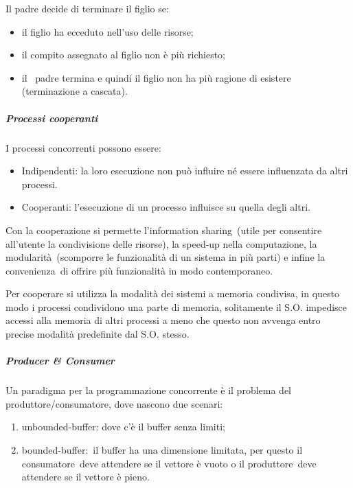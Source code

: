 \documentclass[
]{article}
\providecommand{\tightlist}{%
  \setlength{\itemsep}{0pt}\setlength{\parskip}{0pt}}
\begin{document}
{Il padre decide di terminare il figlio se:}

\begin{itemize}
\tightlist
\item
  {il figlio ha ecceduto nell'uso delle risorse;}
\item
  {il compito assegnato al figlio non è più richiesto;}
\item
  {il ~padre termina e quindi il figlio non ha più ragione di esistere
  (}{terminazione a cascata}{).}
\end{itemize}

\subparagraph{\texorpdfstring{{Processi
cooperanti}}{Processi cooperanti}}\label{h.3zgn3syfyvga}

{I processi concorrenti possono essere:}

{}

\begin{itemize}
\tightlist
\item
  {Indipendenti}{: la loro esecuzione non può influire né essere
  influenzata da altri processi.}
\item
  {Cooperanti}{: l'esecuzione di un processo influisce su quella degli
  altri. }
\end{itemize}

{}

{Con la cooperazione si permette l'}{information sharing}{~(utile per
consentire all'utente la condivisione delle risorse), la }{speed-up
nella computazione}{, la }{modularità}{~(scomporre le funzionalità di un
sistema in più parti) e infine la }{convenienza}{~di offrire più
funzionalità in modo contemporaneo.}

{}

{Per cooperare si utilizza la modalità dei }{sistemi a }{memoria
condivisa}{, in questo modo i processi condividono una parte di memoria,
solitamente il S.O. impedisce accessi alla memoria di altri processi a
meno che questo non avvenga entro precise modalità predefinite dal
}{S.O. stesso}{.}

\subparagraph{\texorpdfstring{{Producer \&
Consumer}}{Producer \& Consumer}}\label{h.ggi02vb437wk}

{Un paradigma per la programmazione concorrente è il problema del
produttore/consumatore, dove nascono due scenari:}

\begin{enumerate}
\tightlist
\item
  {unbounded-buffer}{: dove c'è il buffer senza limiti;}
\item
  {bounded-buffer:}{~il buffer ha una dimensione limitata, per questo il
  }{consumatore}{~deve attendere se il vettore è vuoto o il
  }{produttore}{~deve attendere se il vettore è pieno.}
\end{enumerate}
\end{document}
